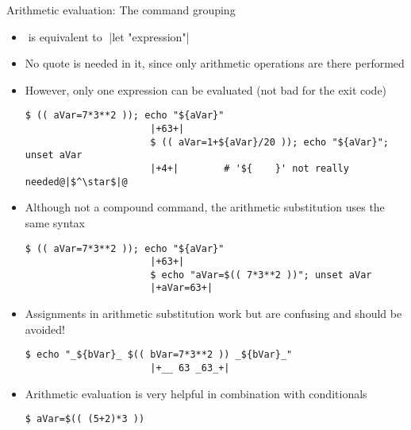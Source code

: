 \begin{frame}[fragile]{Arithmetic evaluation: The command grouping \PB{\texttt{((\ldots))}}}
    \vspace{-1mm}
    \begin{overlayarea}{\textwidth}{0.7\textheight}
        \begin{itemize}
            \item<only@1>  $\;$is  equivalent to$\;$ \bash|let "expression"|
            \item<only@1> No quote is needed in it, since only arithmetic operations are there performed
            \item<only@1> However, only one expression can be evaluated (not bad for the exit code)
                  \begin{lstlisting}[style=MyBash, style=oddnumbers, aboveskip=2mm, belowskip=-6mm]
                      $ (( aVar=7*3**2 )); echo "${aVar}"
                      |+63+|
                      $ (( aVar=1+${aVar}/20 )); echo "${aVar}"; unset aVar
                      |+4+|        # '${    }' not really needed@|$^\star$|@
                  \end{lstlisting}
            \item<only@1> Although not a compound command, the arithmetic substitution uses the same syntax
                  \begin{lstlisting}[style=MyBash, style=oddnumbers, aboveskip=2mm, belowskip=-6mm, firstnumber=4]
                      $ (( aVar=7*3**2 )); echo "${aVar}"
                      |+63+|
                      $ echo "aVar=$(( 7*3**2 ))"; unset aVar
                      |+aVar=63+|
                  \end{lstlisting}
            \item<only@1> Assignments in arithmetic substitution work but are confusing and should be avoided!
                  \begin{lstlisting}[style=MyBash, style=oddnumbers, aboveskip=2mm, belowskip=-6mm, firstnumber=8]
                      $ echo "_${bVar}_ $(( bVar=7*3**2 )) _${bVar}_"
                      |+__ 63 _63_+|
                  \end{lstlisting}
            \item<only@2> Arithmetic evaluation is very helpful in combination with conditionals
                  \begin{lstlisting}[style=MyBash, aboveskip=2mm, belowskip=-6mm, firstnumber=11]
                      $ aVar=$(( (5+2)*3 ))

\end{lstlisting}
\end{itemize}
\end{overlayarea}
\end{frame}
